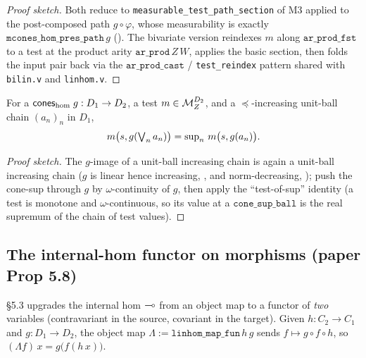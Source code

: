 \begin{proof}[Proof sketch]
Both reduce to \texttt{measurable\_test\_path\_section} of M3 applied
to the post-composed path $g \circ \varphi$, whose measurability is
exactly $\texttt{mcones\_hom\_pres\_path}\,g$
(). The
bivariate version reindexes $m$ along $\texttt{ar\_prod\_fst}$ to a
test at the product arity $\texttt{ar\_prod}\,Z\,W$, applies the basic
section, then folds the input pair back via the
$\texttt{ar\_prod\_cast}$ / \texttt{test\_reindex} pattern shared with
\texttt{bilin.v} and \texttt{linhom.v}.
\end{proof}

\begin{lemma}%
\label{lem:test-pullback-cont}
\rocqok
{}
For a $\mathsf{cones}_{\mathrm{hom}}\;g : D_1 \to D_2$, a test $m \in
\mathcal{M}^{D_2}_Z$, and a $\preceq$-increasing unit-ball chain $(a_n)_n$
in $D_1$,
\[
  m\bigl(s, g(\textstyle\bigvee_n a_n)\bigr)
  = \sup_n\, m\bigl(s, g(a_n)\bigr).
\]
\end{lemma}

\begin{proof}[Proof sketch]
The $g$-image of a unit-ball increasing chain is again a unit-ball
increasing chain ($g$ is linear hence increasing,
, and
norm-decreasing,
); push the
cone-sup through $g$ by $\omega$-continuity of $g$, then apply the
``test-of-sup'' identity
 (a test is monotone
and $\omega$-continuous, so its value at a $\texttt{cone\_sup\_ball}$
is the real supremum of the chain of test values).
\end{proof}

\subsection{The internal-hom functor on morphisms (paper Prop 5.8)}%
\label{sec:linhom-functor}

\S5.3 upgrades the internal hom $\multimap$ from an object map to a functor
of \emph{two} variables (contravariant in the source, covariant in the
target). Given $h : C_2 \to C_1$ and $g : D_1 \to D_2$, the object map
$\Lambda := \texttt{linhom\_map\_fun}\,h\,g$ sends $f \mapsto g \circ f
\circ h$, so $(\Lambda f)\,x = g\bigl(f(h\,x)\bigr)$.

